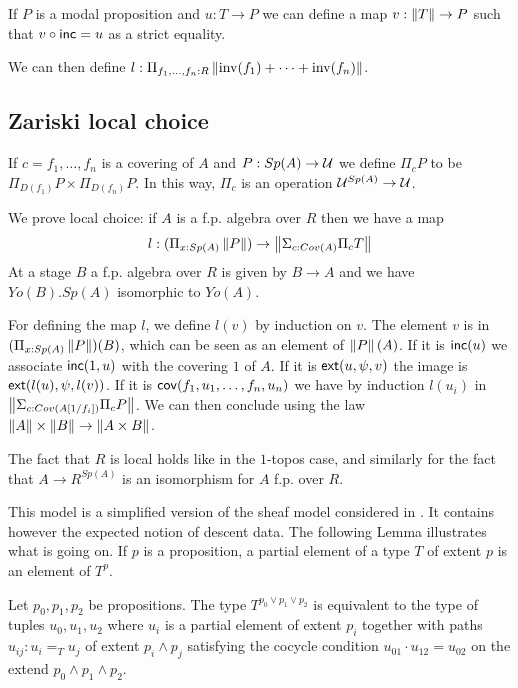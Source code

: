 If $P$ is a modal proposition and $u:T\rightarrow P$ we can define a map $v:\left\lVert T \right\rVert\rightarrow P$
such that $v\circ\mathsf{inc} = u$ as a strict equality.

We can then define $l:\Pi_{f_1,\dots,f_n:R}\left\lVert \mathrm{inv}(f_1)+\dots+\mathrm{inv}(f_n) \right\rVert$.

\subsection{Zariski local choice}

If $c = f_1,\dots,f_n$ is a covering of $A$ and $P:Sp(A)\rightarrow \mathcal{U}$ we define
$\Pi_c P$ to be $\Pi_{D(f_1)}P\times\Pi_{D(f_n)}P$. In this way, $\Pi_c$ is an operation
$\mathcal{U}^{Sp(A)}\rightarrow\mathcal{U}$.

We prove local choice: if $A$ is a f.p. algebra over $R$ then we have a map
$$
l:(\Pi_{x:Sp(A)}\left\lVert P \right\rVert)\rightarrow \left\lVert \Sigma_{c:Cov(A)}\Pi_cT \right\rVert
$$
At a stage $B$ a f.p. algebra over $R$ is given by $B\rightarrow A$ and we have $Yo(B).Sp(A)$ isomorphic
to $Yo(A)$.

For defining the map $l$, we define $l(v)$ by induction on $v$.
The element $v$ is in $(\Pi_{x:Sp(A)}\left\lVert P \right\rVert)(B)$, which can be seen as
an element of $\left\lVert P \right\rVert(A)$. If it is $\mathsf{inc}(u)$ we associate $\mathsf{inc}(1,u)$ with the covering $1$ of $A$.
If it is $\mathsf{ext}(u,\psi,v)$ the image is $\mathsf{ext}(l(u),\psi,l(v))$.
If it is $\mathsf{cov}(f_1,u_1,\dots,f_n,u_n)$ we have by induction $l(u_i)$ in $\left\lVert \Sigma_{c:Cov(A[1/f_i])}\Pi_c P \right\rVert$.
We can then conclude using the law $\left\lVert A \right\rVert\times \left\lVert B \right\rVert\rightarrow\left\lVert A\times B \right\rVert$.

\medskip

The fact that $R$ is local holds like in the $1$-topos case, and similarly for the fact that
$A\rightarrow R^{Sp(A)}$ is an isomorphism for $A$ f.p. over $R$.

\medskip

 This model is a  simplified version of the sheaf model considered in \cite{CRS21}. It contains however the expected notion
of descent data. The following Lemma illustrates what is going on. If $p$ is a proposition, a partial element of a type $T$ of
extent $p$ is an element of $T^p$.

\begin{lemma}
  Let $p_0,p_1,p_2$ be propositions. The type $T^{p_0\vee p_1\vee p_2}$ is equivalent to the type of tuples $u_0,u_1,u_2$
  where $u_i$ is a partial element of extent $p_i$ together with paths $u_{ij}:u_i =_T u_j$ of extent $p_i\wedge p_j$
  satisfying the cocycle condition $u_{01}\cdot u_{12} = u_{02}$ on the extend $p_0\wedge p_1\wedge p_2$.
\end{lemma}

